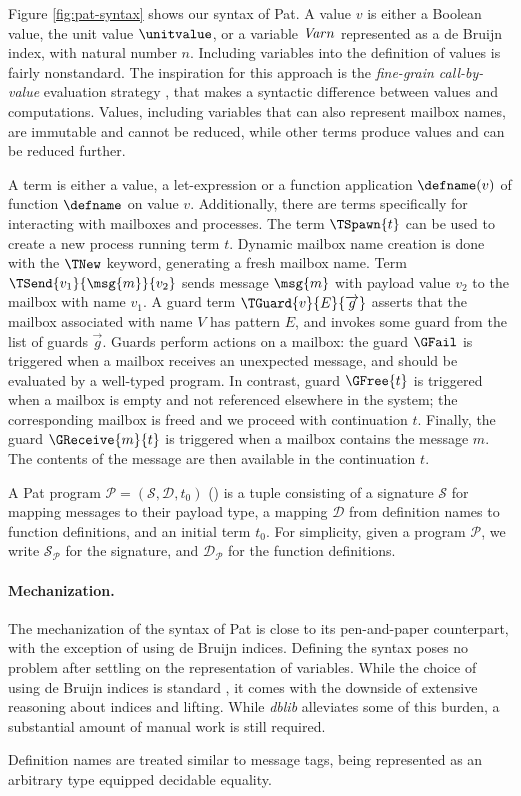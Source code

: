 Figure \ref{fig:pat-syntax} shows our syntax of Pat.
A value $v$ is either a Boolean value, the unit value $\unitvalue$, or a variable ${\it Var}{n}$ represented as a de Bruijn index, with natural number $n$.
Including variables into the definition of values is fairly nonstandard.
The inspiration for this approach is the \emph{fine-grain call-by-value} evaluation strategy \cite{levyModellingEnvironmentsCallbyvalue2003},
that makes a syntactic difference between values and computations.
Values, including variables that can also represent mailbox names, are immutable and cannot be reduced, while
other terms produce values and can be reduced further.

A term is either a value, a let-expression or a function application $\defname(v)$ of function $\defname$ on value $v$.
Additionally, there are terms specifically for interacting with mailboxes and processes.
The term $\TSpawn{t}$ can be used to create a new process running term $t$.
Dynamic mailbox name creation is done with the $\TNew$ keyword, generating a fresh mailbox name.
Term $\TSend{v_1}{\msg{m}}{v_2}$ sends message $\msg{m}$ with payload value $v_2$ to the mailbox with name $v_1$.
A guard term $\TGuard{v}{E}{\overrightarrow{g}}$ asserts that the mailbox associated with name $V$ has pattern $E$, and invokes some guard from the list of guards $\overrightarrow{g}$.
Guards perform actions on a mailbox:
the guard $\GFail$ is triggered when a mailbox receives an unexpected message,
and should be evaluated by a well-typed program.
In contrast, guard $\GFree{t}$ is triggered when a mailbox is empty and not
referenced elsewhere in the system;
the corresponding mailbox is freed and we proceed with continuation $t$.
Finally, the guard $\GReceive{m}{t}$ is triggered when a mailbox contains the message $m$.
The contents of the message are then available in the continuation $t$.

A Pat program $\mathcal{P} = (\mathcal{S}, \mathcal{D}, t_0)$ () is a tuple consisting of a signature $\mathcal{S}$ for mapping messages to their payload type,
a mapping $\mathcal{D}$ from definition names to function definitions, and an initial term $t_0$.
For simplicity, given a program $\mathcal{P}$, we write $\mathcal{S}_\mathcal{P}$ for the signature, and $\mathcal{D}_\mathcal{P}$ for the function definitions.

\paragraph{Mechanization.}
The mechanization of the syntax of Pat is close to its pen-and-paper counterpart,
with the exception of using de Bruijn indices.
Defining the syntax poses no problem after settling on the representation of variables.
While the choice of using de Bruijn indices is standard \cite{ambalHOPiCoq2021,tiroreMultipartyAsynchronousSession2025,starkMechanisingSyntaxBinders2019}, it comes with the downside of extensive reasoning about indices and lifting.
While \emph{dblib} alleviates some of this burden, a substantial amount of manual work is still required.

Definition names are treated similar to message tags, being represented as an arbitrary type equipped decidable equality.
